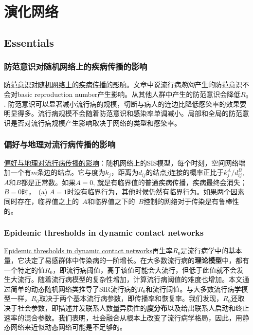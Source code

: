 \chapter{演化网络}

\section{Essentials}

\subsection{防范意识对随机网络上的疾病传播的影响}
\href{https://www.sciencedirect.com/science/article/pii/S002251931930459X}{防范意识对随机网络上的疾病传播的影响}。文章中说流行病\textit{期间}产生的防范意识不会对basic reproduction number产生影响。从其他人群中产生的防范意识会降低$R_0$. 防范意识可以显著减小流行病的规模，切断与病人的连边比降低感染率的效果要明显得多。流行病规模不会随着防范意识和感染率单调减小。局部和全局的防范意识是否对流行病规模产生影响取决于网络的类型和感染率。

\subsection{偏好与地理对流行病传播的影响}
\href{https://journals.aps.org/pre/abstract/10.1103/PhysRevE.76.056109}{偏好与地理对流行病传播的影响}：随机网络上的SIS模型，每个时刻，空间网络增加一个有$m$条边的结点。它与度为$k_{j}$，距离为$d_{ij}$的结点$j$连接的概率正比于$k^{A}_{j}/d^{B}_{ij}$, $A$和$B$都是正常数。如果$A=0$, 就是有临界值的普通疾病传播，疾病最终会消失；$B=0$时，~(a) $A=1$时没有临界行为，其他时候仍然有临界行为。如果两个因素同时存在，临界值之上的~$A$和临界值之下的~$B$控制的网络对于传染是有鲁棒性的。

\subsection{Epidemic thresholds in dynamic contact networks}
\href{https://royalsocietypublishing.org/doi/pdf/10.1098/rsif.2008.0218}{Epidemic thresholds in dynamic contact networks}再生率$R_0$是流行病学中的基本量，它决定了易感群体中传染病的一阶增长。在大多数流行病的\textbf{理论模型}中，都有一个特定的值$R_0$，即流行病阈值，高于该值可能会大流行，但低于此值就不会发生大流行。随着流行病模型的复杂性增加，计算流行病阈值的难度也增加。本文通过简单的动态随机网络类推导了SIR流行病的$R_0$和流行阈值。与大多数流行病学模型一样，$R_0$取决于两个基本流行病参数，即传播率和恢复率。我们发现，$R_0$还取决于社会参数，即描述并发联系人数量异质性的\textbf{度分布}以及给出联系人启动和终止速率的混合参数。我们表明，社会融合从根本上改变了流行病学格局，因此，用静态网络来近似动态网络可能是不足够的。

